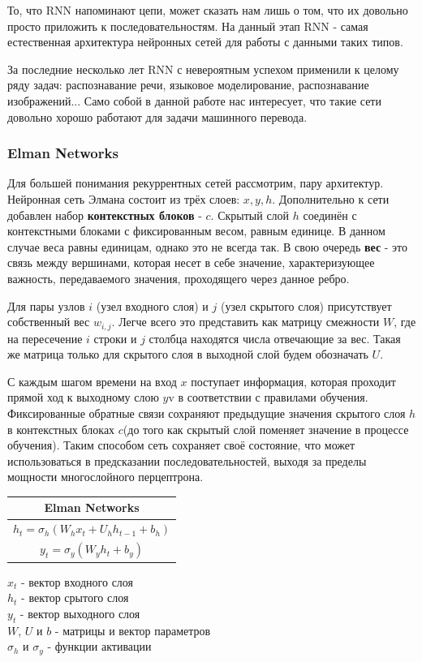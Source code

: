 	То, что RNN напоминают цепи, может сказать нам лишь о том, что их довольно просто приложить к последовательностям. На данный этап RNN - самая естественная архитектура нейронных сетей для работы с данными таких типов.
	
	За последние несколько лет RNN с невероятным успехом применили к целому ряду задач: распознавание речи, языковое моделирование, распознавание изображений... Само собой в данной работе нас интересует, что такие сети довольно хорошо работают для задачи машинного перевода.
	
	\subsubsection{Elman Networks}
	
	Для большей понимания рекуррентных сетей рассмотрим, пару архитектур. Нейронная сеть Элмана состоит из трёх слоев: $x, y, h$. Дополнительно к сети добавлен набор \textbf{контекстных блоков} - $c$. Скрытый слой $h$ соединён с контекстными блоками с фиксированным весом, равным единице. В данном случае веса равны единицам, однако это не всегда так. В свою очередь \textbf{вес} - это связь между вершинами, которая несет в себе значение, характеризующее важность, передаваемого значения, проходящего через данное ребро. 
	
	Для пары узлов $i$ (узел входного слоя) и $j$ (узел скрытого слоя) присутствует собственный вес $w_{i,j}$. Легче всего это представить как матрицу смежности $W$, где на пересечение $i$ строки и $j$ столбца находятся числа отвечающие за вес. Такая же матрица только для скрытого слоя в выходной слой будем обозначать $U$. 
	
	С каждым шагом времени на вход $x$ поступает информация, которая проходит прямой ход к выходному слою $y$v в соответствии с правилами обучения. Фиксированные обратные связи сохраняют предыдущие значения скрытого слоя $h$ в контекстных блоках $c$(до того как скрытый слой поменяет значение в процессе обучения). Таким способом сеть сохраняет своё состояние, что может использоваться в предсказании последовательностей, выходя за пределы мощности многослойного перцептрона.
	
	\begin{table}[h]
		\centering
		\begin{tabular}{|c|} 
			\hline
			\textbf{Elman Networks}  \\ 
			\hline
			$ h_{t} = \sigma_{h}(W_h x_t + U_h h_{t - 1} + b_h) $ \\ 
			$ y_{t} = \sigma_{y}(W_y h_t + b_y) $ \\
			\hline
		\end{tabular}
	\end{table}
	\begin{tabbing}
		$x_t$ - вектор входного слоя        \\
		$h_t$ - вектор срытого слоя         \\
		$y_t$ - вектор выходного слоя       \\
		$W$, $U$ и $b$ - матрицы и вектор параметров       \\
		$\sigma_h$ и $\sigma_y$ - функции активации
	\end{tabbing}
	
